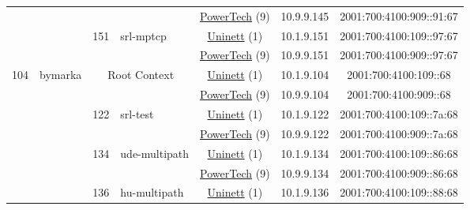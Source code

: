 \begin{small}
\begin{center}
\begin{longtable}{|c|c|c|c|c|c|c|c|}
  &  &  &  & \multicolumn{2}{|c|}{\tiny{\href{http://www.powertech.no}{PowerTech} (9)}} & \tiny{10.9.9.145} & \tiny{2001:700:4100:909::91:67} \\* \cline{3-3}\cline{4-4}\cline{5-5}\cline{6-6}\cline{7-7}\cline{8-8}
  &  & \multirow{2}{*}{\tiny{151}} & \multicolumn{1}{|l|}{\multirow{2}{*}{\tiny{srl-mptcp}}} & \multicolumn{2}{|c|}{\tiny{\href{https://www.uninett.no}{Uninett} (1)}} & \tiny{10.1.9.151} & \tiny{2001:700:4100:109::97:67} \\* \cline{5-5}\cline{6-6}\cline{7-7}\cline{8-8}
  &  &  &  & \multicolumn{2}{|c|}{\tiny{\href{http://www.powertech.no}{PowerTech} (9)}} & \tiny{10.9.9.151} & \tiny{2001:700:4100:909::97:67} \\ \hline
 \multirow{18}{*}{\tiny{104}} & \multicolumn{1}{|l|}{\multirow{18}{*}{\tiny{bymarka}}} & \multicolumn{2}{|c|}{\multirow{2}{*}{\tiny{Root Context}}} & \multicolumn{2}{|c|}{\tiny{\href{https://www.uninett.no}{Uninett} (1)}} & \tiny{10.1.9.104} & \tiny{2001:700:4100:109::68} \\* \cline{5-5}\cline{6-6}\cline{7-7}\cline{8-8}
  &  & \multicolumn{2}{|c|}{} & \multicolumn{2}{|c|}{\tiny{\href{http://www.powertech.no}{PowerTech} (9)}} & \tiny{10.9.9.104} & \tiny{2001:700:4100:909::68} \\* \cline{3-3}\cline{4-4}\cline{5-5}\cline{6-6}\cline{7-7}\cline{8-8}
  &  & \multirow{2}{*}{\tiny{122}} & \multicolumn{1}{|l|}{\multirow{2}{*}{\tiny{srl-test}}} & \multicolumn{2}{|c|}{\tiny{\href{https://www.uninett.no}{Uninett} (1)}} & \tiny{10.1.9.122} & \tiny{2001:700:4100:109::7a:68} \\* \cline{5-5}\cline{6-6}\cline{7-7}\cline{8-8}
  &  &  &  & \multicolumn{2}{|c|}{\tiny{\href{http://www.powertech.no}{PowerTech} (9)}} & \tiny{10.9.9.122} & \tiny{2001:700:4100:909::7a:68} \\* \cline{3-3}\cline{4-4}\cline{5-5}\cline{6-6}\cline{7-7}\cline{8-8}
  &  & \multirow{2}{*}{\tiny{134}} & \multicolumn{1}{|l|}{\multirow{2}{*}{\tiny{ude-multipath}}} & \multicolumn{2}{|c|}{\tiny{\href{https://www.uninett.no}{Uninett} (1)}} & \tiny{10.1.9.134} & \tiny{2001:700:4100:109::86:68} \\* \cline{5-5}\cline{6-6}\cline{7-7}\cline{8-8}
  &  &  &  & \multicolumn{2}{|c|}{\tiny{\href{http://www.powertech.no}{PowerTech} (9)}} & \tiny{10.9.9.134} & \tiny{2001:700:4100:909::86:68} \\* \cline{3-3}\cline{4-4}\cline{5-5}\cline{6-6}\cline{7-7}\cline{8-8}
  &  & \multirow{2}{*}{\tiny{136}} & \multicolumn{1}{|l|}{\multirow{2}{*}{\tiny{hu-multipath}}} & \multicolumn{2}{|c|}{\tiny{\href{https://www.uninett.no}{Uninett} (1)}} & \tiny{10.1.9.136} & \tiny{2001:700:4100:109::88:68} \\* \cline{5-5}\cline{6-6}\cline{7-7}\cline{8-8}

\end{longtable}
\end{center}
\end{small}
